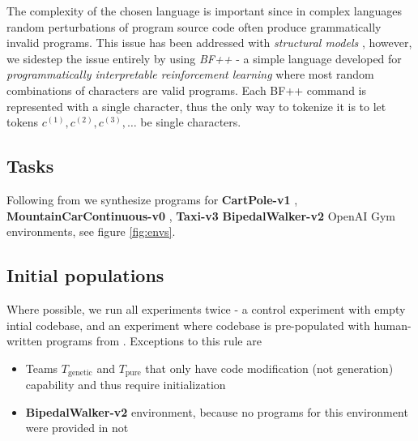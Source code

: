 
The complexity of the chosen language is important since in complex languages random perturbations of program source code often produce grammatically invalid programs.
This issue has been addressed with \emph{structural models} \cite{grammargp,structural} \cite[chapter 4]{genprogast}, however, we sidestep the issue entirely by using \emph{BF++} \cite{bf++} - a simple language developed for \emph{programmatically interpretable reinforcement learning} where most random combinations of characters are valid programs.
Each BF++ command is represented with a single character, thus the only way to tokenize it is to let tokens $c^{(1)},c^{(2)},c^{(3)},\dots$ be single characters.

\subsection{Tasks}
\label{sec:tasks}

\begin{figure*}[t]
    \centering
    \caption{Selected tasks, visualized}
    \label{fig:envs}
\end{figure*}

Following from \cite{bf++} we synthesize programs for \textbf{CartPole-v1} \cite{cartpole}, \textbf{MountainCarContinuous-v0} \cite{mountain_car}, \textbf{Taxi-v3} \cite{taxi} \textbf{BipedalWalker-v2}  OpenAI Gym \cite{gym} environments, see figure \ref{fig:envs}.

\subsection{Initial populations}

Where possible, we run all experiments twice - a control experiment with empty intial codebase, and an experiment where codebase is pre-populated with human-written programs from \cite{bf++}.
Exceptions to this rule are 
\begin{itemize}
    \item Teams $T_\text{genetic}$ and $T_\text{pure}$ that only have code modification (not generation) capability and thus require initialization 
    \item \textbf{BipedalWalker-v2} environment, because no programs for this environment were provided in \cite{bf++} not 
\end{itemize}

